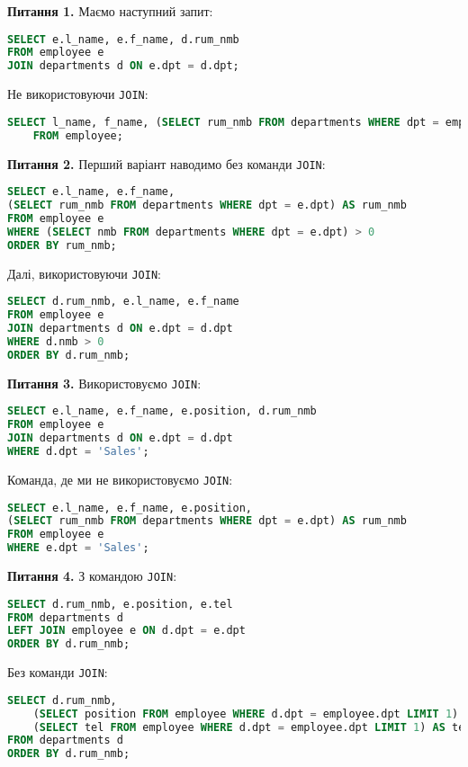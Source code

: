 \documentclass{hw_template}
\begin{document}
\textbf{Питання 1.} Маємо наступний запит:
\begin{lstlisting}[language=SQL]
SELECT e.l_name, e.f_name, d.rum_nmb
FROM employee e
JOIN departments d ON e.dpt = d.dpt;
\end{lstlisting}

Не використовуючи \texttt{JOIN}:
\begin{lstlisting}[language=SQL]
    SELECT l_name, f_name, (SELECT rum_nmb FROM departments WHERE dpt = employee.dpt) AS rum_nmb
    FROM employee;    
\end{lstlisting}

\textbf{Питання 2.} Перший варіант наводимо без команди \texttt{JOIN}:
\begin{lstlisting}[language=SQL]
SELECT e.l_name, e.f_name, 
(SELECT rum_nmb FROM departments WHERE dpt = e.dpt) AS rum_nmb
FROM employee e
WHERE (SELECT nmb FROM departments WHERE dpt = e.dpt) > 0
ORDER BY rum_nmb;
\end{lstlisting}

Далі, використовуючи \texttt{JOIN}:
\begin{lstlisting}[language=SQL]
SELECT d.rum_nmb, e.l_name, e.f_name
FROM employee e
JOIN departments d ON e.dpt = d.dpt
WHERE d.nmb > 0
ORDER BY d.rum_nmb;
\end{lstlisting}

\textbf{Питання 3.} Використовуємо \texttt{JOIN}:
\begin{lstlisting}[language=SQL]
SELECT e.l_name, e.f_name, e.position, d.rum_nmb
FROM employee e
JOIN departments d ON e.dpt = d.dpt
WHERE d.dpt = 'Sales';
\end{lstlisting}

Команда, де ми не використовуємо \texttt{JOIN}:
\begin{lstlisting}[language=SQL]
SELECT e.l_name, e.f_name, e.position,
(SELECT rum_nmb FROM departments WHERE dpt = e.dpt) AS rum_nmb
FROM employee e
WHERE e.dpt = 'Sales';
\end{lstlisting}

\textbf{Питання 4.} З командою \texttt{JOIN}:
\begin{lstlisting}[language=SQL]
SELECT d.rum_nmb, e.position, e.tel
FROM departments d
LEFT JOIN employee e ON d.dpt = e.dpt
ORDER BY d.rum_nmb;
\end{lstlisting}

Без команди \texttt{JOIN}:
\begin{lstlisting}[language=SQL]
SELECT d.rum_nmb,
    (SELECT position FROM employee WHERE d.dpt = employee.dpt LIMIT 1) AS position,
    (SELECT tel FROM employee WHERE d.dpt = employee.dpt LIMIT 1) AS tel
FROM departments d
ORDER BY d.rum_nmb;
\end{lstlisting}
\end{document}

